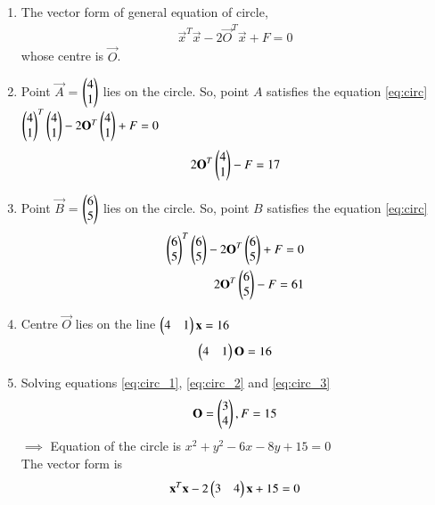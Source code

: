 \renewcommand{\theequation}{\theenumi}
\begin{enumerate}[label=\arabic*.,ref=\thesubsubsection.\theenumi]
\item The vector form of general equation of circle, 
\begin{align} 
\vec{x}^T\vec{x}-2\vec{O}^T\vec{x}+F=0 \label{eq:circ}
\end{align}
whose centre is $\vec{O}$.

\item Point $\vec{A}$ = $\begin{pmatrix}4\\1\end{pmatrix}$ lies on the circle. So, point $A$ satisfies the equation \ref{eq:circ} \\
$\begin{pmatrix}4\\1\end{pmatrix}^T\begin{pmatrix}4\\1\end{pmatrix}-2\mathbf{O}^T\begin{pmatrix}4\\1\end{pmatrix}+F=0$ \\
\begin{align} 
2\mathbf{O}^T\begin{pmatrix}4\\1\end{pmatrix} - F = 17 \label{eq:circ_1}
\end{align}

\item Point $\vec{B}$ = $\begin{pmatrix}6\\5\end{pmatrix}$ lies on the circle. So, point $B$ satisfies the equation \ref{eq:circ} 
\begin{align}
\begin{pmatrix}6\\5\end{pmatrix}^T\begin{pmatrix}6\\5\end{pmatrix}-2\mathbf{O}^T\begin{pmatrix}6\\5\end{pmatrix}+F=0
\\
2\mathbf{O}^T\begin{pmatrix}6\\5\end{pmatrix} - F = 61 \label{eq:circ_2}
\end{align}

\item  Centre $\vec{O}$ lies on the line $\begin{pmatrix}4&1\end{pmatrix}\mathbf{x}=16$ \\
\begin{align} 
\begin{pmatrix}4&1\end{pmatrix}\mathbf{O}=16 \label{eq:circ_3}
\end{align}

\item Solving equations \ref{eq:circ_1}, \ref{eq:circ_2} and \ref{eq:circ_3} \\
$$ \mathbf{O} = \begin{pmatrix}3\\4\end{pmatrix}, F = 15$$
$\implies$ Equation of the circle is $x^2+y^2-6x-8y+15=0$ \\ 
The vector form is 
$$\mathbf{x}^T\mathbf{x}-2\begin{pmatrix}3&4\end{pmatrix}\mathbf{x}+15=0$$


\end{enumerate}
